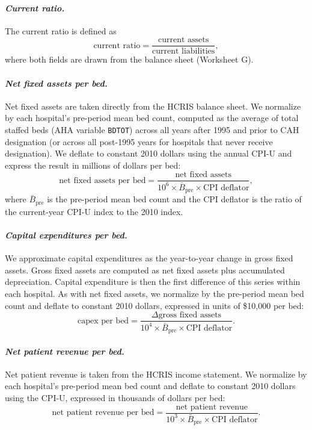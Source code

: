 \documentclass[a4paper, 12pt]{article}
\begin{document}
\paragraph{\textit{Current ratio.}} The current ratio is defined as
$$
\text{current ratio} = \frac{\text{current assets}}{\text{current liabilities}},
$$
where both fields are drawn from the balance sheet (Worksheet G).

\paragraph{\textit{Net fixed assets per bed.}} Net fixed assets are taken directly from the HCRIS balance sheet. We normalize by each hospital's pre-period mean bed count, computed as the average of total staffed beds (AHA variable \texttt{BDTOT}) across all years after 1995 and prior to CAH designation (or across all post-1995 years for hospitals that never receive designation). We deflate to constant 2010 dollars using the annual CPI-U and express the result in millions of dollars per bed:
$$
\text{net fixed assets per bed} = \frac{\text{net fixed assets}}{10^6 \times \bar{B}_{\text{pre}} \times \text{CPI deflator}},
$$
where $\bar{B}_{\text{pre}}$ is the pre-period mean bed count and the CPI deflator is the ratio of the current-year CPI-U index to the 2010 index.

\paragraph{\textit{Capital expenditures per bed.}} We approximate capital expenditures as the year-to-year change in gross fixed assets. Gross fixed assets are computed as net fixed assets plus accumulated depreciation. Capital expenditure is then the first difference of this series within each hospital. As with net fixed assets, we normalize by the pre-period mean bed count and deflate to constant 2010 dollars, expressed in units of \$10,000 per bed:
$$
\text{capex per bed} = \frac{\Delta\text{gross fixed assets}}{10^4 \times \bar{B}_{\text{pre}} \times \text{CPI deflator}}.
$$

\paragraph{\textit{Net patient revenue per bed.}} Net patient revenue is taken from the HCRIS income statement. We normalize by each hospital's pre-period mean bed count and deflate to constant 2010 dollars using the CPI-U, expressed in thousands of dollars per bed:
$$
\text{net patient revenue per bed} = \frac{\text{net patient revenue}}{10^3 \times \bar{B}_{\text{pre}} \times \text{CPI deflator}}.
$$
\end{document}
